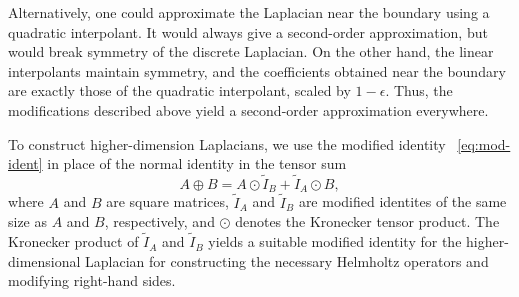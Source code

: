 Alternatively, one could approximate the Laplacian near the boundary using a quadratic
interpolant. It would always give a second-order approximation, but would break symmetry
of the discrete Laplacian. On the other hand, the linear interpolants maintain symmetry,
and the coefficients obtained near the boundary are exactly those of the quadratic
interpolant, scaled by $1-\epsilon$. Thus, the modifications described above yield a
second-order approximation everywhere.

To construct higher-dimension Laplacians, we use the modified identity~%
\eqref{eq:mod-ident} in place of the normal identity in the tensor sum
\begin{equation*}
    A\oplus B = A\odot \tilde{I}_B + \tilde{I}_A\odot B,
\end{equation*}
where $A$ and $B$ are square matrices, $\tilde{I}_A$ and $\tilde{I}_B$ are modified
identites of the same size as $A$ and $B$, respectively, and $\odot$ denotes the
Kronecker tensor product. The Kronecker product of $\tilde{I}_A$ and $\tilde{I}_B$ yields
a suitable modified identity for the higher-dimensional Laplacian for constructing the
necessary Helmholtz operators and modifying right-hand sides.
